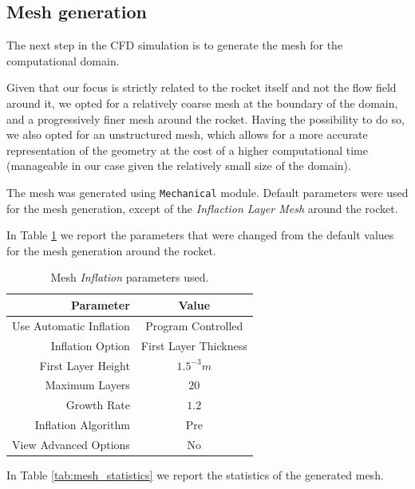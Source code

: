 \subsection{Mesh generation}
\label{subsec:mesh_generation}

The next step in the CFD simulation is to generate the mesh for the computational domain.

Given that our focus is strictly related to the rocket itself and not the flow field around it, we opted for a relatively coarse mesh at the boundary of the domain, and a progressively finer mesh around the rocket.
Having the possibility to do so, we also opted for an unstructured mesh, which allows for a more accurate representation of the geometry at the cost of a higher computational time (manageable in our case given the relatively small size of the domain).

The mesh was generated using \texttt{Mechanical} module.
Default parameters were used for the mesh generation, except of the \textit{Inflaction Layer Mesh} around the rocket.

In Table \ref{tab:mesh_inflaction} we report the parameters that were changed from the default values for the mesh generation around the rocket.

\begin{table}[H]
    \centering
    \begin{tabular}{|r|c|}
        \hline
        \textbf{Parameter}      & \textbf{Value}        \\
        \hline
        Use Automatic Inflation & Program Controlled    \\
        Inflation Option        & First Layer Thickness \\
        First Layer Height      & $1.5^{-3}m$           \\
        Maximum Layers          & $20$                  \\
        Growth Rate             & $1.2$                 \\
        Inflation Algorithm     & Pre                   \\
        View Advanced Options   & No                    \\
        \hline
    \end{tabular}
    \caption{Mesh \textit{Inflation} parameters used.}
    \label{tab:mesh_inflaction}
\end{table}

In Table \ref{tab:mesh_statistics} we report the statistics of the generated mesh.

